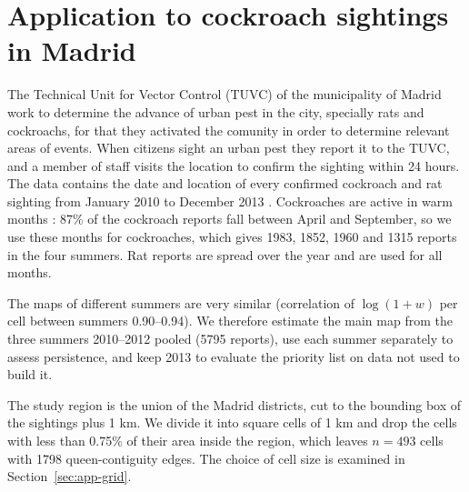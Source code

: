 \section{Application to cockroach sightings in Madrid}\label{sec:app}


The Technical Unit for Vector Control (TUVC) of the municipality of Madrid work to determine  the advance of urban pest in the city, specially rats and cockroachs, for that they activated the comunity in order to determine relevant areas of events. When citizens sight an urban pest they report it to the TUVC, and a member of staff visits the location to confirm the sighting within 24 hours. The data contains the date and location of every confirmed cockroach and rat sighting from January 2010 to December 2013 \citep{tamayo2014risk}. Cockroaches are active in warm months \citep{ifeanyi2015microbiology}: 87\% of the cockroach reports fall between April and September, so we use these months for cockroaches, which gives 1983, 1852, 1960 and 1315 reports in the four summers. Rat reports are spread over the year and are used for all months.

The maps of different summers are very similar (correlation of $\log(1+w)$ per cell between summers 0.90--0.94). We therefore estimate the main map from the three summers 2010--2012 pooled (5795 reports), use each summer separately to assess persistence, and keep 2013 to evaluate the priority list on data not used to build it.

The study region is the union of the Madrid districts, cut to the bounding box of the sightings plus 1 km. We divide it into square cells of 1 km and drop the cells with less than 0.75\% of their area inside the region, which leaves $n=493$ cells with 1798 queen-contiguity edges. The choice of cell size is examined in Section~\ref{sec:app-grid}.

